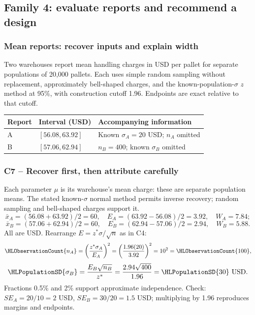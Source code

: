 \subsection{Family 4: evaluate reports and recommend a design}\label{sec:family-four}
\medskip
\subsubsection{Mean reports: recover inputs and explain width}\label{prob:c7-report-mean}
Two warehouses report mean handling charges in USD per pallet for separate populations of 20,000 pallets. Each uses simple random sampling without replacement, approximately bell-shaped charges, and the known-population-$\sigma$ $z$ method at 95\%, with construction cutoff 1.96. Endpoints are exact relative to that cutoff.
\begin{center}\begin{tabular}{@{}lll@{}}\toprule
Report & Interval (USD) & Accompanying information\\\midrule
A & $[56.08,63.92]$ & Known $\sigma_A=20$ USD; $n_A$ omitted\\
B & $[57.06,62.94]$ & $n_B=400$; known $\sigma_B$ omitted\\\bottomrule
\end{tabular}\end{center}
\subsubsection*{C7 -- Recover first, then attribute carefully}\label{sol:c7-report-mean}
Each parameter $\mu$ is its warehouse's mean charge: these are separate population means. The stated known-$\sigma$ normal method permits inverse recovery; random sampling and bell-shaped charges support it.
\[\bar x_A=(56.08+63.92)/2=60,\quad E_A=(63.92-56.08)/2=3.92,\quad W_A=7.84;\]
\[\bar x_B=(57.06+62.94)/2=60,\quad E_B=(62.94-57.06)/2=2.94,\quad W_B=5.88.\]
All are USD. Rearrange $E=z^*\sigma/\sqrt n$ as in C4:
\[\HLObservationCount{n_A}=\left(\frac{z^*\sigma_A}{E_A}\right)^2
=\left(\frac{1.96(20)}{3.92}\right)^2=10^2=\HLObservationCount{100},\]
\[\HLPopulationSD{\sigma_B}=\frac{E_B\sqrt{n_B}}{z^*}
=\frac{2.94\sqrt{400}}{1.96}=\HLPopulationSD{30}\text{ USD}.\]
Fractions 0.5\% and 2\% support approximate independence. Check: $SE_A=20/10=2$ USD, $SE_B=30/20=1.5$ USD; multiplying by 1.96 reproduces margins and endpoints.

